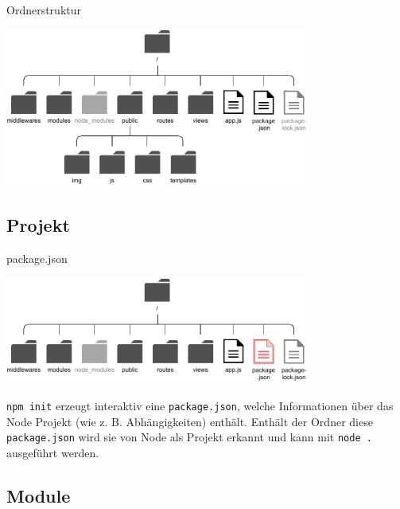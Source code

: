 \begin{example}{Ordnerstruktur}
    \begin{center}
        \includegraphics[width=0.75\textwidth]{includes/figures/example_nodejs_ordnerstruktur.pdf}
    \end{center}
\end{example}

\subsection{Projekt}

\begin{bonus}{package.json}
    \begin{center}
        \includegraphics[width=0.75\textwidth]{includes/figures/bonus_nodejs_package.pdf}
    \end{center}

    \texttt{npm init} erzeugt interaktiv eine \texttt{package.json}, welche Informationen über das Node Projekt (wie z. B. Abhängigkeiten) enthält.
    Enthält der Ordner diese \texttt{package.json} wird sie von Node als Projekt erkannt und kann mit \texttt{node .} ausgeführt werden.
\end{bonus}

\subsection{Module}

